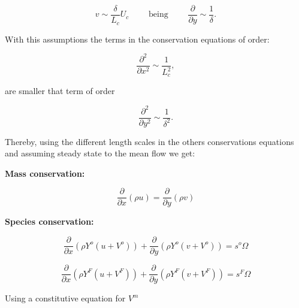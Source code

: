 \begin{equation}
v\sim\frac{\delta}{L_c}U_c\qquad
\text{ being }\qquad
\frac{\partial}{\partial y}\sim \frac{1}{\delta}.
\end{equation}

With this assumptions the terms in the conservation equations of order: 

\begin{equation}
\frac{\partial^2}{\partial x^2}\sim\frac{1}{L_c^2},
\end{equation}

are smaller that term of order   

\begin{equation}
\frac{\partial^2}{\partial y^2}\sim\frac{1}{\delta^2}.
\end{equation}

Thereby, using the different length scales in the others conservations equations
and assuming steady state to the mean flow we get: 

\textbf{Mass conservation:}

\begin{equation} 
\frac{\partial}{\partial x}(\rho u)=
\frac{\partial}{\partial y}(\rho v)
\label{mass1}
\end{equation} 


\textbf{Species conservation:}

\begin{equation} 
\frac{\partial}{\partial x}(\rho Y^{o}(u+V^{o}))+
\frac{\partial}{\partial y}(\rho Y^{o}(v+V^{o}))
=s^{o}\Omega
\end{equation} 

\begin{equation} 
\frac{\partial}{\partial x}(\rho Y^{F}(u+V^{F}))+
\frac{\partial}{\partial y}(\rho Y^{F}(v+V^{F}))
=s^{F}\Omega
\end{equation} 

Using a constitutive equation for $V^m$ 

